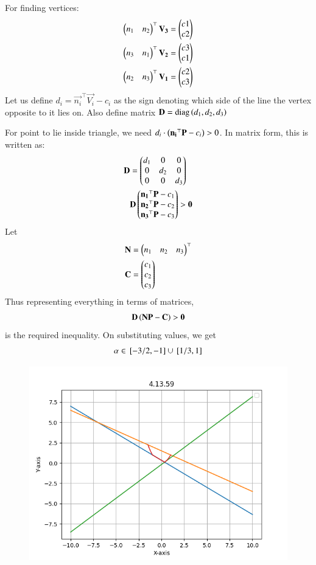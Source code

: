 \documentclass[journal,12pt,onecolumn]{IEEEtran}
\theoremstyle{remark}
\begin{document}
For finding vertices:
\begin{align}
 \begin{pmatrix}n_1 & n_2\end{pmatrix}^\top\mathbf{V_3} = \begin{pmatrix}c1 \\ c2\end{pmatrix} \\
 \begin{pmatrix}n_3 & n_1\end{pmatrix}^\top\mathbf{V_2} = \begin{pmatrix}c3 \\ c1\end{pmatrix} \\
 \begin{pmatrix}n_2 & n_3\end{pmatrix}^\top\mathbf{V_1} = \begin{pmatrix}c2 \\ c3\end{pmatrix}
\end{align}
Let us define $d_i = \vec{n_i}^\top\vec{V_i}-c_i$ as the sign denoting which side of the line the vertex opposite to it lies on. Also define matrix $\mathbf{D} = \text{diag}\left(d_1,d_2,d_3\right)$ \par\noindent
For point to lie inside triangle, we need $d_i\cdot\left(\mathbf{n_i}^\top\mathbf{P}-c_i\right) > 0$. In matrix form, this is written as:
\begin{align}
\mathbf{D} &= \begin{pmatrix}d_1 & 0 & 0 \\ 0 & d_2 & 0 \\ 0 & 0 & d_3\end{pmatrix} \\
  &\mathbf{D}\begin{pmatrix}\mathbf{n_1}^\top\mathbf{P}-c_1 \\ \mathbf{n_2}^\top\mathbf{P}-c_2 \\ \mathbf{n_3}^\top\mathbf{P}-c_3\end{pmatrix} > \mathbf{0}
\end{align}
Let
\begin{align}
 \mathbf{N} &= \begin{pmatrix}n_1 & n_2 & n_3\end{pmatrix}^\top \\
 \mathbf{C} &= \begin{pmatrix}c_1 \\ c_2 \\ c_3\end{pmatrix}
\end{align}
Thus representing everything in terms of matrices,
\begin{align}
 \mathbf{D}\left(\mathbf{N}\mathbf{P}-\mathbf{C}\right) > \mathbf{0}
\end{align}
is the required inequality. On substituting values, we get
\begin{align}
 \alpha \in {}\left[-3/2,-1\right] \cup {}\left[1/3, 1\right]
\end{align}
\begin{figure}[H]
    \centering
    \includegraphics{figs/python.png}
    \caption*{}
    \label{fig:plot}
\end{figure}
\end{document}
